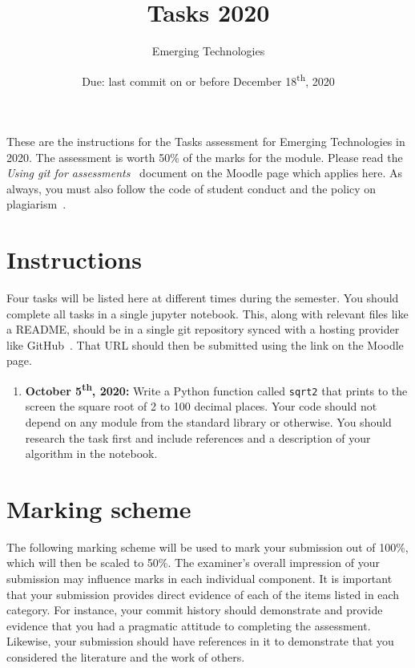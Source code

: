 \documentclass[a4paper, 12pt]{scrartcl}
\title{\vspace{-20mm}Tasks 2020}
\author{Emerging Technologies}
\date{Due: last commit on or before December 18\textsuperscript{th}, 2020\vspace{-6mm}}
\begin{document}
  
  \maketitle

  These are the instructions for the Tasks assessment for Emerging Technologies in 2020.
  The assessment is worth 50\% of the marks for the module.
  Please read the \emph{Using git for assessments}~\cite{usinggit} document on the Moodle page which applies here.
  As always, you must also follow the code of student conduct and the policy on plagiarism~\cite{gmitqaf}.

  \section*{Instructions}
    Four tasks will be listed here at different times during the semester.
    You should complete all tasks in a single jupyter notebook.
    This, along with relevant files like a README, should be in a single git repository synced with a hosting provider like GitHub~\cite{github}.
    That URL should then be submitted using the link on the Moodle page.

    \begin{enumerate}
      \item
        \textbf{October 5\textsuperscript{th}, 2020:}
        Write a Python function called \texttt{sqrt2} that prints to the screen the square root of 2 to 100 decimal places.
        Your code should not depend on any module from the standard library or otherwise.
        You should research the task first and include references and a description of your algorithm in the notebook.
    \end{enumerate}

  \newpage

  \section*{Marking scheme}
    The following marking scheme will be used to mark your submission out of 100\%, which will then be scaled to 50\%.
    The examiner's overall impression of your submission may influence marks in each individual component.
    It is important that your submission provides direct evidence of each of the items listed in each category.
    For instance, your commit history should demonstrate and provide evidence that you had a pragmatic attitude to completing the assessment.
    Likewise, your submission should have references in it to demonstrate that you considered the literature and the work of others.
  
\end{document}
